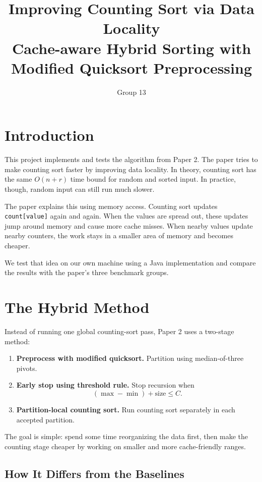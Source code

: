 \documentclass[11pt]{article}
\title{
    \vspace{-1.2em}
    \textbf{Improving Counting Sort via Data Locality}\\
    \large Cache-aware Hybrid Sorting with Modified Quicksort Preprocessing
}
\author{Group 13}
\date{}
\begin{document}
    \maketitle
    \thispagestyle{empty}

    \section{Introduction}

    This project implements and tests the algorithm from Paper 2. The paper tries to make counting
    sort faster by improving data locality. In theory, counting sort has the same $O(n + r)$ time
    bound for random and sorted input. In practice, though, random input can still run much slower.

    The paper explains this using memory access. Counting sort updates
    \texttt{count[value]} again and again. When the values are spread out, these updates jump
    around memory and cause more cache misses. When nearby values update nearby counters, the work
    stays in a smaller area of memory and becomes cheaper.

    We test that idea on our own machine using a Java implementation and compare the results with
    the paper's three benchmark groups.


    \section{The Hybrid Method}

    Instead of running one global counting-sort pass, Paper 2 uses a two-stage method:

    \begin{enumerate}
        \item \textbf{Preprocess with modified quicksort.} Partition using median-of-three pivots.
        \item \textbf{Early stop using threshold rule.} Stop recursion when
        \[
            (\max - \min) + \text{size} \leq C.
        \]
        \item \textbf{Partition-local counting sort.} Run counting sort separately in each accepted partition.
    \end{enumerate}

    The goal is simple: spend some time reorganizing the data first, then make the counting stage
    cheaper by working on smaller and more cache-friendly ranges.

    \subsection{How It Differs from the Baselines}
\end{document}
